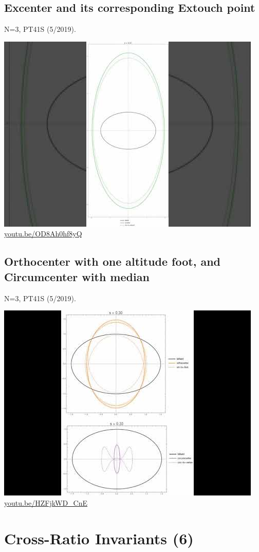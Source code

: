 \documentclass[12pt]{amsart}
\begin{document}
\subsection{Excenter and its corresponding Extouch point}
\label{vid:OD8Ah0hf8yQ}
\noindent N=3, PT41S (5/2019). 
\begin{center}\includegraphics[width=.5\textwidth]{pics/OD8Ah0hf8yQ.jpg} \\ 
\href{https://youtu.be/OD8Ah0hf8yQ}{\url{youtu.be/OD8Ah0hf8yQ}}\end{center}
% 
\subsection{Orthocenter with one altitude foot, and Circumcenter with median}
\label{vid:HZFjkWD_CnE}
\noindent N=3, PT41S (5/2019). 
\begin{center}\includegraphics[width=.5\textwidth]{pics/HZFjkWD_CnE.jpg} \\ 
\href{https://youtu.be/HZFjkWD_CnE}{\url{youtu.be/HZFjkWD\_CnE}}\end{center}
% 

\section{Cross-Ratio Invariants (6)}
\end{document}
